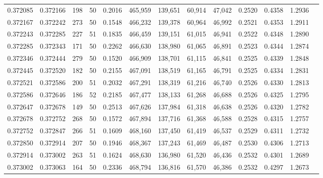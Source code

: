 \begin{tabular}{rrrrrrrrrrrrr}
0.372085 & 0.372166 &   198 &  50 &                                     0.2016 & 465,959 & 139,651 &  60,914 &  47,042 & 0.2520 & 0.4358 & 1.2936 \\
0.372167 & 0.372242 &   273 &  50 &                                     0.1548 & 466,232 & 139,378 &  60,964 &  46,992 & 0.2521 & 0.4353 & 1.2911 \\
0.372243 & 0.372285 &   227 &  51 &                                     0.1835 & 466,459 & 139,151 &  61,015 &  46,941 & 0.2522 & 0.4348 & 1.2890 \\
0.372285 & 0.372343 &   171 &  50 &                                     0.2262 & 466,630 & 138,980 &  61,065 &  46,891 & 0.2523 & 0.4344 & 1.2874 \\
0.372346 & 0.372444 &   279 &  50 &                                     0.1520 & 466,909 & 138,701 &  61,115 &  46,841 & 0.2525 & 0.4339 & 1.2848 \\
0.372445 & 0.372520 &   182 &  50 &                                     0.2155 & 467,091 & 138,519 &  61,165 &  46,791 & 0.2525 & 0.4334 & 1.2831 \\
0.372521 & 0.372586 &   200 &  51 &                                     0.2032 & 467,291 & 138,319 &  61,216 &  46,740 & 0.2526 & 0.4330 & 1.2813 \\
0.372586 & 0.372646 &   186 &  52 &                                     0.2185 & 467,477 & 138,133 &  61,268 &  46,688 & 0.2526 & 0.4325 & 1.2795 \\
0.372647 & 0.372678 &   149 &  50 &                                     0.2513 & 467,626 & 137,984 &  61,318 &  46,638 & 0.2526 & 0.4320 & 1.2782 \\
0.372678 & 0.372752 &   268 &  50 &                                     0.1572 & 467,894 & 137,716 &  61,368 &  46,588 & 0.2528 & 0.4315 & 1.2757 \\
0.372752 & 0.372847 &   266 &  51 &                                     0.1609 & 468,160 & 137,450 &  61,419 &  46,537 & 0.2529 & 0.4311 & 1.2732 \\
0.372850 & 0.372914 &   207 &  50 &                                     0.1946 & 468,367 & 137,243 &  61,469 &  46,487 & 0.2530 & 0.4306 & 1.2713 \\
0.372914 & 0.373002 &   263 &  51 &                                     0.1624 & 468,630 & 136,980 &  61,520 &  46,436 & 0.2532 & 0.4301 & 1.2689 \\
0.373002 & 0.373063 &   164 &  50 &                                     0.2336 & 468,794 & 136,816 &  61,570 &  46,386 & 0.2532 & 0.4297 & 1.2673 \\

\end{tabular}
